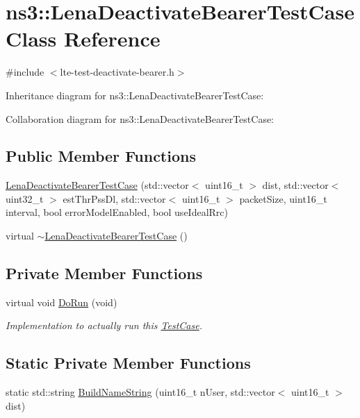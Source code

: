 \hypertarget{classns3_1_1LenaDeactivateBearerTestCase}{}\section{ns3\+:\+:Lena\+Deactivate\+Bearer\+Test\+Case Class Reference}
\label{classns3_1_1LenaDeactivateBearerTestCase}


{\ttfamily \#include $<$lte-\/test-\/deactivate-\/bearer.\+h$>$}



Inheritance diagram for ns3\+:\+:Lena\+Deactivate\+Bearer\+Test\+Case\+:


Collaboration diagram for ns3\+:\+:Lena\+Deactivate\+Bearer\+Test\+Case\+:
\subsection*{Public Member Functions}
\begin{DoxyCompactItemize}
\item 
\hyperlink{classns3_1_1LenaDeactivateBearerTestCase_a4dba05305aa047cb95b414060d02c8e8}{Lena\+Deactivate\+Bearer\+Test\+Case} (std\+::vector$<$ uint16\+\_\+t $>$ dist, std\+::vector$<$ uint32\+\_\+t $>$ est\+Thr\+Pss\+Dl, std\+::vector$<$ uint16\+\_\+t $>$ packet\+Size, uint16\+\_\+t interval, bool error\+Model\+Enabled, bool use\+Ideal\+Rrc)
\item 
virtual \hyperlink{classns3_1_1LenaDeactivateBearerTestCase_ad44880c5177df52b76017bfa8850cbc5}{$\sim$\+Lena\+Deactivate\+Bearer\+Test\+Case} ()
\end{DoxyCompactItemize}
\subsection*{Private Member Functions}
\begin{DoxyCompactItemize}
\item 
virtual void \hyperlink{classns3_1_1LenaDeactivateBearerTestCase_a214d777e46f96b701efdfd360871f53f}{Do\+Run} (void)
\begin{DoxyCompactList}\small\item\em Implementation to actually run this \hyperlink{classns3_1_1TestCase}{Test\+Case}. \end{DoxyCompactList}\end{DoxyCompactItemize}
\subsection*{Static Private Member Functions}
\begin{DoxyCompactItemize}
\item 
static std\+::string \hyperlink{classns3_1_1LenaDeactivateBearerTestCase_aaae207a6200341a78589c7de27446675}{Build\+Name\+String} (uint16\+\_\+t n\+User, std\+::vector$<$ uint16\+\_\+t $>$ dist)
\end{DoxyCompactItemize}
